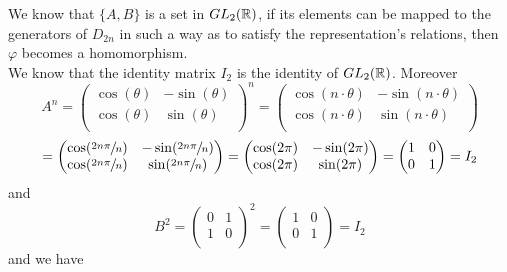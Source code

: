 \documentclass[12pt]{article}
\begin{document}
\begin{enumerate}[label=\textbf{\alph*.}]
            We know that $\{A, B\}$ is a set in $GL_2(\mathbb{R})$,
            if its elements can be mapped to the generators of $D_{2n}$
            in such a way as to satisfy the representation's relations,
            then $\varphi$ becomes a homomorphism. \\ 
            We know that the identity matrix $I_2$ is the identity of
            $GL_2(\mathbb{R})$.
            Moreover
            \[ A^n = \begin{pmatrix}
                \cos(\theta) & -\sin(\theta) \\
                \cos(\theta) & \sin(\theta) \\
            \end{pmatrix}^n
            = \begin{pmatrix}
                \cos(n \cdot \theta) & -\sin(n \cdot \theta) \\
                \cos(n \cdot \theta) & \sin(n \cdot \theta) \\
            \end{pmatrix} \]
            \[ = \begin{pmatrix}
                \cos(\sfrac{2n \pi}{n}) & -\sin(\sfrac{2n \pi}{n}) \\
                \cos(\sfrac{2n \pi}{n}) & \sin(\sfrac{2n \pi}{n}) \\
            \end{pmatrix} 
             = \begin{pmatrix}
                \cos(2\pi) & -\sin(2\pi) \\
                \cos(2\pi) & \sin(2\pi) \\
            \end{pmatrix}
            = \begin{pmatrix}
                1 & 0 \\
                0 & 1 \\
            \end{pmatrix} = I_2 \]
            and
            \[ B^2 = \begin{pmatrix}
                0 & 1 \\
                1 & 0 \\
            \end{pmatrix}^2 
            =  \begin{pmatrix}
                1 & 0 \\
                0 & 1 \\
            \end{pmatrix} = I_2 \] 
            and we have

\end{enumerate}
\end{document}
